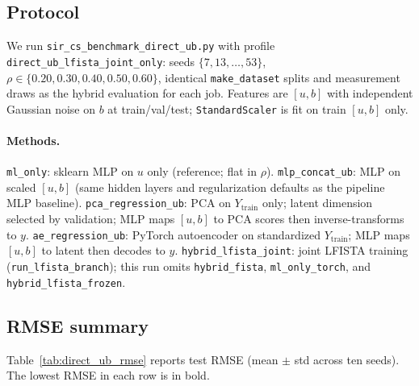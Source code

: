 \subsection{Protocol}
\label{sec:direct_ub_protocol}

We run \texttt{sir\_cs\_benchmark\_direct\_ub.py} with profile \texttt{direct\_ub\_lfista\_joint\_only}: seeds $\{7,13,\ldots,53\}$, $\rho\in\{0.20,0.30,0.40,0.50,0.60\}$, identical \texttt{make\_dataset} splits and measurement draws as the hybrid evaluation for each job.
Features are $[u,b]$ with independent Gaussian noise on $b$ at train/val/test; \texttt{StandardScaler} is fit on train $[u,b]$ only.

\paragraph{Methods.}
\texttt{ml\_only}: sklearn MLP on $u$ only (reference; flat in $\rho$).
\texttt{mlp\_concat\_ub}: MLP on scaled $[u,b]$ (same hidden layers and regularization defaults as the pipeline MLP baseline).
\texttt{pca\_regression\_ub}: PCA on $Y_{\mathrm{train}}$ only; latent dimension selected by validation; MLP maps $[u,b]$ to PCA scores then inverse-transforms to $y$.
\texttt{ae\_regression\_ub}: PyTorch autoencoder on standardized $Y_{\mathrm{train}}$; MLP maps $[u,b]$ to latent then decodes to $y$.
\texttt{hybrid\_lfista\_joint}: joint LFISTA training (\texttt{run\_lfista\_branch}); this run omits \texttt{hybrid\_fista}, \texttt{ml\_only\_torch}, and \texttt{hybrid\_lfista\_frozen}.

\subsection{RMSE summary}
\label{sec:direct_ub_table}

Table~\ref{tab:direct_ub_rmse} reports test RMSE (mean $\pm$ std across ten seeds).
The lowest RMSE in each row is in bold.

